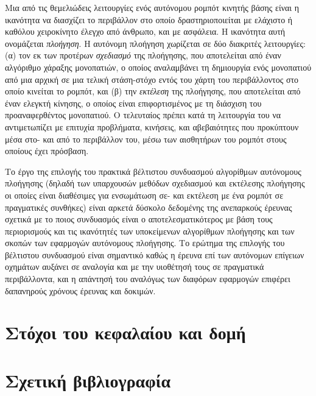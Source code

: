 Μια από τις θεμελιώδεις λειτουργίες ενός αυτόνομου ρομπότ κινητής βάσης είναι η
ικανότητα να διασχίζει το περιβάλλον στο οποίο δραστηριοποιείται με ελάχιστο ή
καθόλου χειροκίνητο έλεγχο από άνθρωπο, και με ασφάλεια. Η ικανότητα αυτή
ονομάζεται \textit{πλοήγηση}. Η αυτόνομη πλοήγηση χωρίζεται σε δύο διακριτές
λειτουργίες: (α) τον εκ των προτέρων \textit{σχεδιασμό} της πλοήγησης, που
αποτελείται από έναν αλγόριθμο χάραξης μονοπατιών, ο οποίος αναλαμβάνει τη
δημιουργία ενός μονοπατιού από μια αρχική σε μια τελική στάση-στόχο εντός του
χάρτη του περιβάλλοντος στο οποίο κινείται το ρομπότ, και (β) την
\textit{εκτέλεση} της πλοήγησης, που αποτελείται από έναν ελεγκτή κίνησης, ο
οποίος είναι επιφορτισμένος με τη διάσχιση του προαναφερθέντος μονοπατιού. Ο
τελευταίος πρέπει κατά τη λειτουργία του να αντιμετωπίζει με επιτυχία
προβλήματα, κινήσεις, και αβεβαιότητες που προκύπτουν μέσα στο- και από το
περιβάλλον του, μέσω των αισθητήρων του ρομπότ στους οποίους έχει πρόσβαση.

Το έργο της επιλογής του πρακτικά βέλτιστου συνδυασμού αλγορίθμων αυτόνομους
πλοήγησης (δηλαδή των υπαρχουσών μεθόδων σχεδιασμού και εκτέλεσης πλοήγησης οι
οποίες είναι διαθέσιμες για ενσωμάτωση σε- και εκτέλεση με ένα ρομπότ σε
πραγματικές συνθήκες) είναι αρκετά δύσκολο δεδομένης της ανεπαρκούς έρευνας
σχετικά με το ποιος συνδυασμός είναι ο αποτελεσματικότερος με βάση τους
περιορισμούς και τις ικανότητές των υποκείμενων αλγορίθμων πλοήγησης και των
σκοπών των εφαρμογών αυτόνομους πλοήγησης. Το ερώτημα της επιλογής του
βέλτιστου συνδυασμού είναι σημαντικό καθώς η έρευνα επί των αυτόνομων επίγειων
οχημάτων αυξάνει σε αναλογία και με την υιοθέτησή τους σε πραγματικά
περιβάλλοντα, και η απάντησή του αναλόγως των διαφόρων εφαρμογών επιφέρει
δαπανηρούς χρόνους έρευνας και δοκιμών.

\section{Στόχοι του κεφαλαίου και δομή}
  \label{section:02_01_01}
  

\section{Σχετική βιβλιογραφία}
  \label{section:02_01_02}
  

